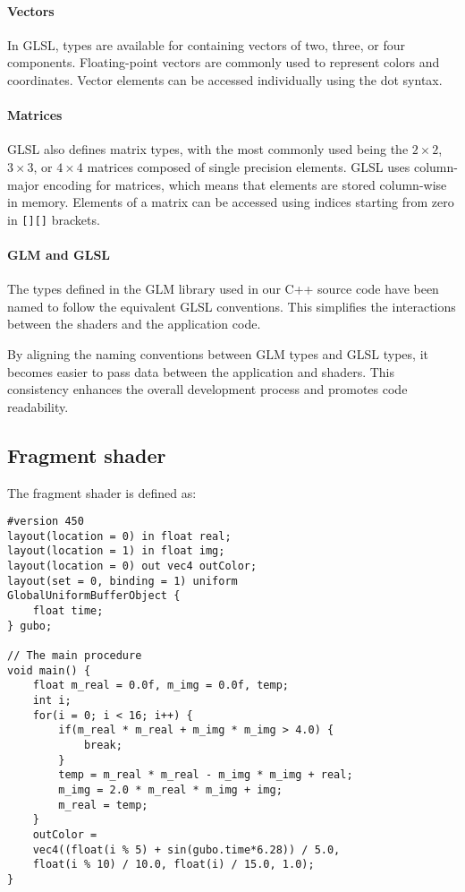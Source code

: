 \paragraph*{Vectors}
In GLSL, types are available for containing vectors of two, three, or four components. 
Floating-point vectors are commonly used to represent colors and coordinates.
Vector elements can be accessed individually using the dot syntax.

\paragraph*{Matrices}
GLSL also defines matrix types, with the most commonly used being the $2\times 2$, $3\times 3$, or $4\times 4$ matrices composed of single precision elements.
GLSL uses column-major encoding for matrices, which means that elements are stored column-wise in memory. 
Elements of a matrix can be accessed using indices starting from zero in \texttt{[][]} brackets. 

\paragraph*{GLM and GLSL}
The types defined in the GLM library used in our C++ source code have been named to follow the equivalent GLSL conventions. 
This simplifies the interactions between the shaders and the application code.

By aligning the naming conventions between GLM types and GLSL types, it becomes easier to pass data between the application and shaders. 
This consistency enhances the overall development process and promotes code readability.

\subsection{Fragment shader}
The fragment shader is defined as: 
\begin{verbatim}
#version 450
layout(location = 0) in float real;
layout(location = 1) in float img;
layout(location = 0) out vec4 outColor;
layout(set = 0, binding = 1) uniform
GlobalUniformBufferObject {
    float time;
} gubo;

// The main procedure
void main() {
    float m_real = 0.0f, m_img = 0.0f, temp;
    int i;
    for(i = 0; i < 16; i++) {
        if(m_real * m_real + m_img * m_img > 4.0) {
            break;
        }
        temp = m_real * m_real - m_img * m_img + real;
        m_img = 2.0 * m_real * m_img + img;
        m_real = temp;
    }
    outColor =
    vec4((float(i % 5) + sin(gubo.time*6.28)) / 5.0,
    float(i % 10) / 10.0, float(i) / 15.0, 1.0);
}
\end{verbatim}
